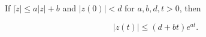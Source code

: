 If $|\dot{z}| \leq a |z| + b$ and $|z(0)| < d$ for $a, b, d, t > 0$, then

$$|z(t)| \leq (d + bt)e^{at}.$$

